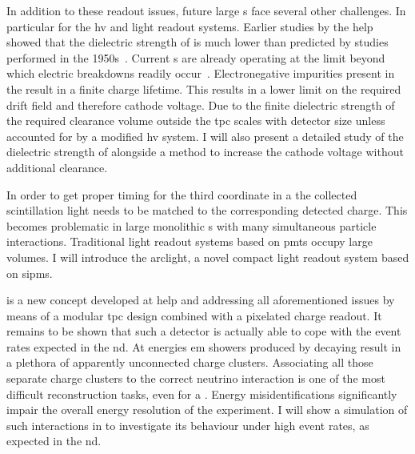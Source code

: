 In addition to these readout issues, future large \lartpc{}s face several other challenges.
In particular for the \gls{hv} and light readout systems.
Earlier studies by the \gls{help}~\cite{breakdown_14} showed that the dielectric strength of \lar{} is much lower than predicted by studies performed in the 1950s~\cite{swan1, swan2}.
Current \lartpc{}s are already operating at the limit beyond which electric breakdowns readily occur~\cite{uboone}.
Electronegative impurities present in the \lar{} result in a finite charge lifetime.
This results in a lower limit on the required drift field and therefore cathode voltage.
Due to the finite dielectric strength of \lar{} the required clearance volume outside the \gls{tpc} scales with detector size unless accounted for by a modified \gls{hv} system.
I will also present a detailed study of the dielectric strength of \lar{} alongside a method to increase the cathode voltage without additional clearance.

In order to get proper timing for the third coordinate in a \lartpc{} the collected scintillation light needs to be matched to the corresponding detected charge.
This becomes problematic in large monolithic \lartpc{}s with many simultaneous particle interactions.
Traditional light readout systems based on \glspl{pmt} occupy large volumes.
I will introduce the \gls{arclight}, a novel compact light readout system based on \glspl{sipm}.

\AC{} is a new \lartpc{} concept developed at \gls{help} and addressing all aforementioned issues by means of a modular \gls{tpc} design combined with a pixelated charge readout.
It remains to be shown that such a detector is actually able to cope with the event rates expected in the \dune{} \gls{nd}.
At \dune{} energies \gls{em} showers produced by decaying \Pgpz result in a plethora of apparently unconnected charge clusters.
Associating all those separate charge clusters to the correct neutrino interaction is one of the most difficult reconstruction tasks, even for a \lartpc{}.
Energy misidentifications significantly impair the overall energy resolution of the experiment.
I will show a simulation of such interactions in \AC{} to investigate its behaviour under high event rates, as expected in the \dune{} \gls{nd}.

